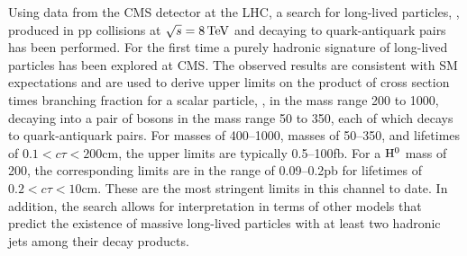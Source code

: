 Using data from the CMS detector at the LHC,
a search for long-lived particles, \X, produced in pp collisions at $\sqrt{s} = 8\,\text{Te\hspace{-.08em}V}$ and decaying
to quark-antiquark pairs has been performed. For the first time a purely hadronic signature
of long-lived particles has been explored at CMS.
The observed results are consistent with SM expectations and are used to derive upper
limits on the product of cross section times branching fraction for a scalar particle,
 \Higgs, in the mass range 200 to 1000\GeV, decaying into a pair of \X bosons in the mass
range 50 to 350\GeV, each of which decays to quark-antiquark pairs. For \Higgs masses of 400--1000\GeV, \X
masses of 50--350\GeV, and \X lifetimes of $0.1<c\tau<200$\:cm, the upper limits are typically 0.5--100\:fb.
 For a $\mathrm{H}^{0}$ mass of 200\GeV, the corresponding limits are in the range of 0.09--0.2\:pb for \X
lifetimes of $0.2<c\tau<10$\:cm. These are the most stringent limits in this channel to date.
In addition, the search allows for interpretation in terms of other models that predict 
the existence of massive long-lived particles with at least two hadronic
jets among their decay products.
